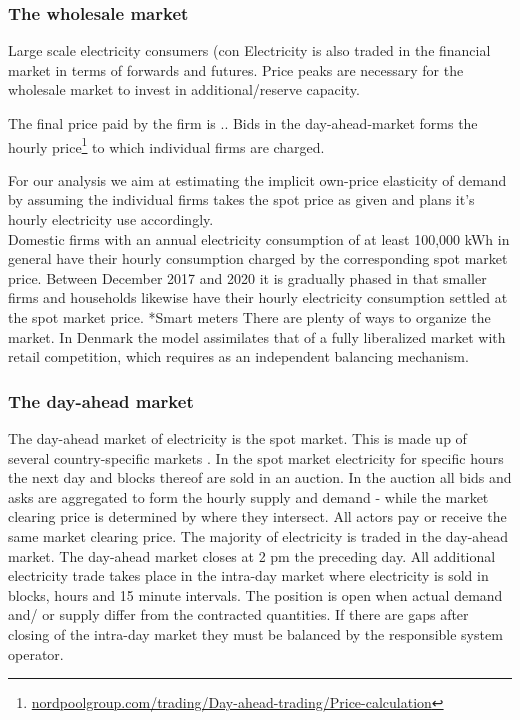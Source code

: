 \subsubsection{The wholesale market}
\label{subsubsec: t_whomarket}
Large scale electricity consumers (con
Electricity is also traded in the financial market in terms of forwards and futures. Price peaks are necessary for the wholesale market to invest in additional/reserve capacity. 

 

The final price paid by the firm is .. 
Bids in the day-ahead-market forms the hourly price\footnote{\url{nordpoolgroup.com/trading/Day-ahead-trading/Price-calculation}} to which individual firms are charged. 

For our analysis we aim at estimating the implicit own-price elasticity of demand by assuming the individual firms takes the spot price as given and plans it's hourly electricity use accordingly.
\medskip\\
Domestic firms with an annual electricity consumption of at least 100,000 kWh in general have their hourly consumption charged by the corresponding spot market price. Between December 2017 and 2020 it is gradually phased in that
smaller firms and households likewise have their hourly electricity consumption settled at the spot market price.
*Smart meters
There are plenty of ways to organize the market. In Denmark the model assimilates that of a fully liberalized market with retail competition, which requires as an independent balancing mechanism. 

\subsubsection{The day-ahead market}
The day-ahead market of electricity is the spot market. This is made up of several country-specific markets . In the spot market electricity for specific hours the next day and blocks thereof are sold in an auction. In the auction all bids and asks are aggregated to form the hourly supply and demand - while the market clearing price is determined by where they intersect. All actors pay or receive the same market clearing price. The majority of electricity is traded in the day-ahead market. %
The day-ahead market closes at 2 pm the preceding day. All additional electricity trade takes place in the intra-day market where electricity is sold in blocks, hours and 15 minute intervals. The position is open when actual demand and/ or supply differ from the contracted quantities. If there are gaps after closing of the intra-day market they must be balanced by the responsible system operator.  



